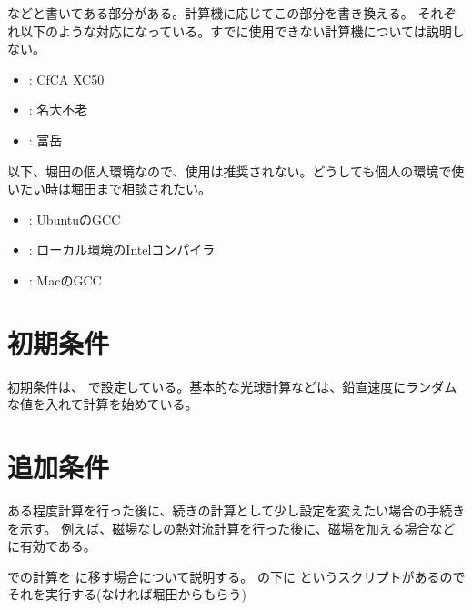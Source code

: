 \documentclass[letterpaper,10pt,dvipdfmx,report]{sphinxmanual}
\begin{document}
\sphinxAtStartPar
などと書いてある部分がある。計算機に応じてこの部分を書き換える。
それぞれ以下のような対応になっている。すでに使用できない計算機については説明しない。
\begin{itemize}
\item {} 
\sphinxAtStartPar
{}: CfCA XC50

\item {} 
\sphinxAtStartPar
{}: 名大不老

\item {} 
\sphinxAtStartPar
{}: 富岳

\end{itemize}

\sphinxAtStartPar
以下、堀田の個人環境なので、使用は推奨されない。どうしても個人の環境で使いたい時は堀田まで相談されたい。
\begin{itemize}
\item {} 
\sphinxAtStartPar
{}: UbuntuのGCC

\item {} 
\sphinxAtStartPar
{}: ローカル環境のIntelコンパイラ

\item {} 
\sphinxAtStartPar
{}: MacのGCC

\end{itemize}


\section{初期条件}
\label{\detokenize{start:id3}}
\sphinxAtStartPar
初期条件は、  で設定している。基本的な光球計算などは、鉛直速度にランダムな値を入れて計算を始めている。


\section{追加条件}
\label{\detokenize{start:id4}}
\sphinxAtStartPar
ある程度計算を行った後に、続きの計算として少し設定を変えたい場合の手続きを示す。
例えば、磁場なしの熱対流計算を行った後に、磁場を加える場合などに有効である。

\sphinxAtStartPar
{} での計算を  に移す場合について説明する。
 の下に  というスクリプトがあるのでそれを実行する(なければ堀田からもらう)
\end{document}
